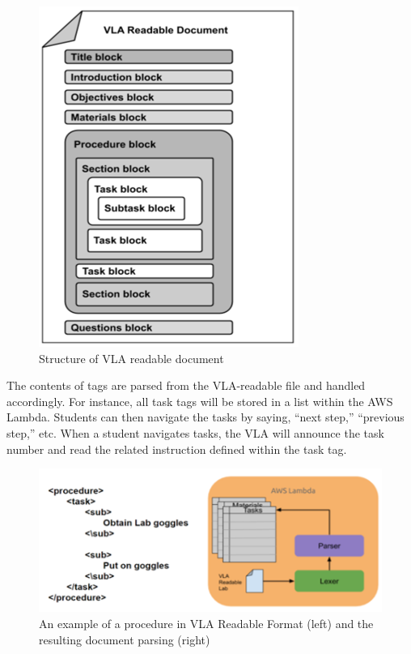 \documentclass[11.5pt]{sig-alternate} %
\begin{document}
\begin{large}
\begin{figure}[!h]
    \centering
    \includegraphics[width=1\linewidth]{fig4.png}
    \caption{Structure of VLA readable document}
\end{figure}

The contents of tags are parsed from the VLA-readable file and handled accordingly. For instance, all task tags will be stored in a list within the AWS Lambda. Students can then navigate the tasks by saying, “next step,” “previous step,” etc. When a student navigates tasks, the VLA will announce the task number and read the related instruction defined within the task tag. 

\begin{figure}[!h]
    \centering
    \includegraphics[width=1\linewidth]{fig5.png}
    \caption{An example of a procedure in VLA Readable Format (left) and the resulting document parsing (right)}
\end{figure}


\end{large}
\end{document}
